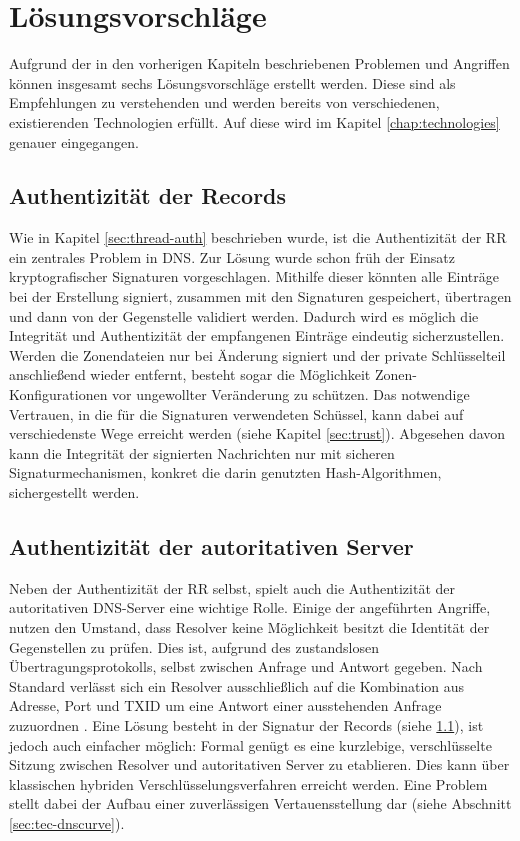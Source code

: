 \chapter{Lösungsvorschläge}
\label{chap:solutions}
Aufgrund der in den vorherigen Kapiteln beschriebenen Problemen und Angriffen können insgesamt sechs Lösungsvorschläge erstellt werden. Diese sind als Empfehlungen zu verstehenden und werden bereits von verschiedenen, existierenden Technologien erfüllt. Auf diese wird im Kapitel \ref{chap:technologies} genauer eingegangen.

\section{Authentizität der Records}
\label{sec:solution-recordauth}
Wie in Kapitel \ref{sec:thread-auth} beschrieben wurde, ist die Authentizität der RR ein zentrales Problem in DNS. Zur Lösung wurde schon früh der Einsatz kryptografischer Signaturen vorgeschlagen. Mithilfe dieser könnten alle Einträge bei der Erstellung signiert, zusammen mit den Signaturen gespeichert, übertragen und dann von der Gegenstelle validiert werden. Dadurch wird es möglich die Integrität und Authentizität der empfangenen Einträge eindeutig sicherzustellen. Werden die Zonendateien nur bei Änderung signiert und der private Schlüsselteil anschließend wieder entfernt, besteht sogar die Möglichkeit Zonen-Konfigurationen vor ungewollter Veränderung zu schützen. Das notwendige Vertrauen, in die für die Signaturen verwendeten Schüssel, kann dabei auf verschiedenste Wege erreicht werden (siehe Kapitel \ref{sec:trust}). Abgesehen davon kann die Integrität der signierten Nachrichten nur mit sicheren Signaturmechanismen, konkret die darin genutzten Hash-Algorithmen, sichergestellt werden\cite{Stevens2017}. 

\section{Authentizität der autoritativen Server}
Neben der Authentizität der RR selbst, spielt auch die Authentizität der autoritativen DNS-Server eine wichtige Rolle. Einige der angeführten Angriffe, nutzen den Umstand, dass Resolver keine Möglichkeit besitzt die Identität der Gegenstellen zu prüfen. Dies ist, aufgrund des zustandslosen Übertragungsprotokolls, selbst zwischen Anfrage und Antwort gegeben. Nach Standard verlässt sich ein Resolver ausschließlich auf die Kombination aus Adresse, Port und TXID um eine Antwort einer ausstehenden Anfrage zuzuordnen \cite{rfc1035}. Eine Lösung besteht in der Signatur der Records (siehe \ref{sec:solution-recordauth}), ist jedoch auch einfacher möglich: Formal genügt es eine kurzlebige, verschlüsselte Sitzung zwischen Resolver und autoritativen Server zu etablieren. Dies kann über klassischen hybriden Verschlüsselungsverfahren erreicht werden. Eine Problem stellt dabei der Aufbau einer zuverlässigen Vertauensstellung dar (siehe Abschnitt \ref{sec:tec-dnscurve}).

